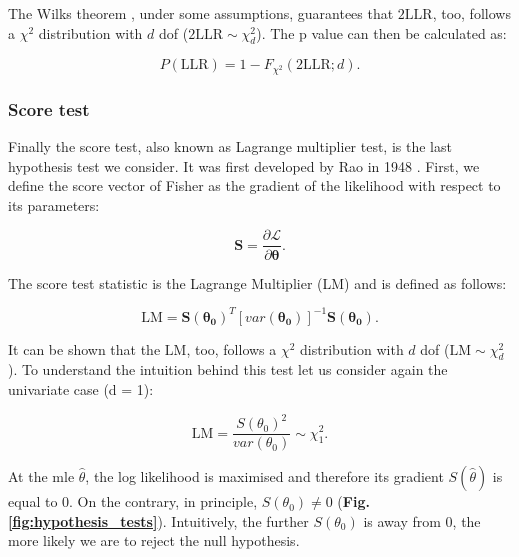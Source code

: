 The Wilks theorem \cite{wilks1938large}, under some assumptions, guarantees that $2\mathrm{LLR}$, too, follows a $\chi^2$ distribution with $d$ dof ($2\mathrm{LLR} \sim \chi^2_d$).
The p value can then be calculated as:

\begin{equation}\label{eq:lrt_p_value}
    P(\mathrm{LLR}) = 1-F_{\chi^2}(2\mathrm{LLR}; d).
\end{equation}

\subsubsection{Score test}

Finally the score test, also known as Lagrange multiplier test, is the last hypothesis test we consider. 
It was first developed by Rao in 1948 \cite{rao1948large}.
First, we define the score vector of Fisher as the gradient of the likelihood with respect to its parameters:

\begin{equation}\label{eq:score_vector}
    \mathbf{S} = \frac{\partial \mathcal{L}}{\partial \boldsymbol{\theta}}.
\end{equation}

The score test statistic is the Lagrange Multiplier (LM) and is defined as follows:

\begin{equation}\label{eq:lagrange_multiplier}
    \mathrm{LM} = \mathbf{S}(\boldsymbol{\theta_0})^T [var(\boldsymbol{\theta_0})]^{-1}\mathbf{S}(\boldsymbol{\theta_0}). 
\end{equation}

It can be shown that the $\mathrm{LM}$, too, follows a $\chi^2$ distribution with $d$ dof ($\mathrm{LM} \sim \chi^2_d$).
To understand the intuition behind this test let us consider again the univariate case (d = 1):

\begin{equation}\label{eq:lagrange_multiplier_univariate}
    \mathrm{LM} = \frac{S(\theta_0)^2}{var(\theta_0)} \sim \chi^2_1.
\end{equation}

At the \gls{mle} $\hat{\theta}$, the log likelihood is maximised and therefore its gradient $S(\hat{\theta})$ is equal to $0$.
On the contrary, in principle, $ S(\theta_0) \neq 0 $ (\textbf{Fig. \ref{fig:hypothesis_tests}}). 
Intuitively, the further $ S(\theta_0) $ is away from 0, the more likely we are to reject the null hypothesis.

